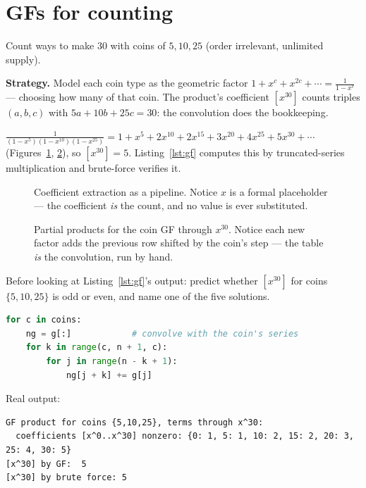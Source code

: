 \section{GFs for counting}\label{sec:gfcount}

\begin{example}\label{ex:coin}
Count ways to make $30$ with coins of $5, 10, 25$ (order irrelevant,
unlimited supply).
\par\smallskip
\textbf{Strategy.} Model each coin type as the geometric factor
$1 + x^c + x^{2c} + \cdots = \frac{1}{1-x^c}$ --- choosing how many of
that coin. The product's coefficient $[x^{30}]$ counts triples
$(a,b,c)$ with $5a + 10b + 25c = 30$: the convolution does the
bookkeeping.
\par\smallskip
\begin{solution}
$\frac{1}{(1-x^5)(1-x^{10})(1-x^{25})}
= 1 + x^5 + 2x^{10} + 2x^{15} + 3x^{20} + 4x^{25} + 5x^{30} + \cdots$
(Figures~\ref{fig:gfflow}, \ref{fig:cointable}), so $[x^{30}] = 5$.
Listing~\ref{lst:gf} computes this by truncated-series multiplication
and brute-force verifies it.
\end{solution}
\end{example}

\begin{figure}[ht]\centering

\caption{Coefficient extraction as a pipeline. Notice $x$ is a formal
placeholder --- the coefficient \emph{is} the count, and no value is
ever substituted.}
\label{fig:gfflow}
\end{figure}

\begin{figure}[ht]\centering

\caption{Partial products for the coin GF through $x^{30}$. Notice each
new factor adds the previous row shifted by the coin's step --- the
table \emph{is} the convolution, run by hand.}
\label{fig:cointable}
\end{figure}

\begin{checkpoint}
Before looking at Listing~\ref{lst:gf}'s output: predict whether
$[x^{30}]$ for coins $\{5,10,25\}$ is odd or even, and name one of the
five solutions.
\end{checkpoint}

\begin{lstlisting}[language=Python,caption={\texttt{gf\_coin.py}: GF
coefficients by truncated-series multiplication + brute-force check
(script in \texttt{code/gf\_coin.py}).},label={lst:gf}]
for c in coins:
    ng = g[:]            # convolve with the coin's series
    for k in range(c, n + 1, c):
        for j in range(n - k + 1):
            ng[j + k] += g[j]
\end{lstlisting}
Real output:
\begin{lstlisting}[numbers=none]
GF product for coins {5,10,25}, terms through x^30:
  coefficients [x^0..x^30] nonzero: {0: 1, 5: 1, 10: 2, 15: 2, 20: 3, 25: 4, 30: 5}
[x^30] by GF:  5
[x^30] by brute force: 5
\end{lstlisting}

